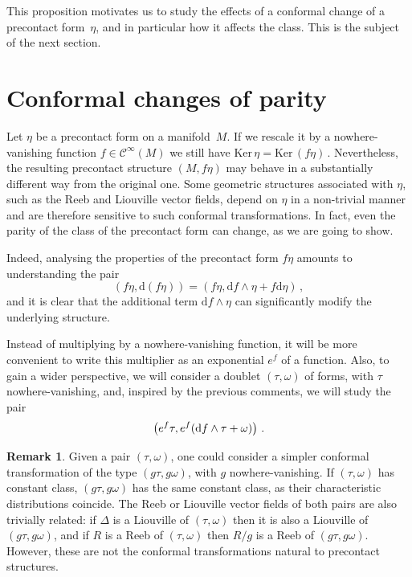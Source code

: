 \documentclass[11pt,twoside]{article}
\theoremstyle{plain}
\theoremstyle{definition}
\newtheorem{remark}[theorem]{Remark}
\renewcommand{\d}{\mathrm{d}}
\newcommand{\Cinfty}{\mathscr{C}^\infty}
\def\d{\mathrm{d}}
\def\d{\mathrm{d}}
\def\Ker{\mathrm{Ker \,}}
\begin{document}
This proposition motivates us to study the effects of a conformal change of a precontact form~$\eta$, and in particular how it affects the class.
This is the subject of the next section.



\section{Conformal changes of parity}\label{sec_changes}

Let $\eta$ be a precontact form on a manifold~$M$.  
If we rescale it by a nowhere-vanishing function 
$f\in \Cinfty(M)$ we still have
$
\Ker\eta = \Ker(f\eta)\,.
$
Nevertheless, the resulting precontact structure $(M,f\eta)$ may behave in a
substantially different way from the original one.  
Some geometric structures associated with $\eta$, such as the Reeb and
Liouville vector fields, depend on $\eta$ in a non-trivial manner and
are therefore sensitive to such conformal transformations.
In fact, even the parity of the class of the precontact form can change,
as we are going to show.

Indeed, analysing the properties of the precontact form $f\eta$ amounts to understanding the pair
$$(f \eta, \d(f\eta)) = (f\eta ,  \d f \wedge \eta +f\d\eta)\,, $$
and it is clear that the additional term $\d f\wedge\eta$ can significantly modify the
underlying structure.

Instead of multiplying by a nowhere-vanishing function, 
it will be more convenient to write this multiplier as an exponential
$e^f$ of a function.
Also, to gain a wider perspective, we will consider a doublet $(\tau,\omega)$ of forms, with $\tau$ nowhere-vanishing, and, inspired by the previous comments, 
we will study the pair 
$$
\left(\strut e^f\tau, e^f(\d f\wedge \tau +\omega) \right) \,.
$$

\begin{remark}
Given a pair $(\tau,\omega)$, 
one could consider a simpler conformal transformation of the type
$(g\tau, g\omega)$,
with $g$ nowhere-vanishing.
If $(\tau,\omega)$ has constant class, $(g\tau, g\omega)$ has the same constant class, 
as their characteristic distributions coincide. 
The Reeb or Liouville vector fields of both pairs are also trivially related: 
if $\Delta$ is a Liouville of $(\tau,\omega)$ then it is also a Liouville of $(g\tau,g\omega)$, 
and if $R$ is a Reeb of $(\tau,\omega)$ then $R/g$ is a Reeb of $(g\tau,g\omega)$. 
However, these are not the conformal transformations natural to precontact structures.
\end{remark}
\end{document}
